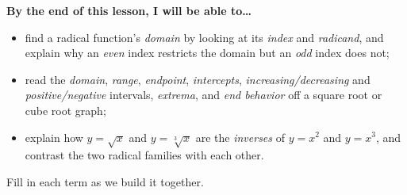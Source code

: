 \documentclass[10pt]{article}
\begin{document}
\namedateperiod

\vspace{0.08in}

\begin{objectivebox}
\textbf{By the end of this lesson, I will be able to\dots}
\begin{itemize}\setlength{\itemsep}{2pt}
  \item find a radical function's \emph{domain} by looking at its \emph{index} and \emph{radicand}, and explain why an \emph{even} index restricts the domain but an \emph{odd} index does not;
  \item read the \emph{domain}, \emph{range}, \emph{endpoint}, \emph{intercepts}, \emph{increasing/decreasing} and \emph{positive/negative} intervals, \emph{extrema}, and \emph{end behavior} off a square root or cube root graph;
  \item explain how $y=\sqrt{x}$ and $y=\sqrt[3]{x}$ are the \emph{inverses} of $y=x^2$ and $y=x^3$, and contrast the two radical families with each other.
\end{itemize}
\end{objectivebox}

\vspace{0.05in}

\begin{vocabbox}
\small
Fill in each term as we build it together.
\par\vspace{2pt}   %
\end{vocabbox}
\end{document}
